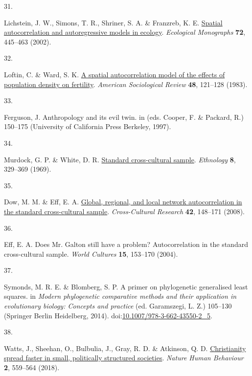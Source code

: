 \documentclass[
  man,floatsintext]{apa6}
\newlength{\cslhangindent}
\newlength{\csllabelwidth}
\newlength{\cslentryspacingunit} %
\newenvironment{CSLReferences}[2] %
 {%
  \setlength{\parindent}{0pt}
  \ifodd #1
  \let\oldpar\par
  \def\par{\hangindent=\cslhangindent\oldpar}
  \fi
  \setlength{\parskip}{#2\cslentryspacingunit}
 }%
 {}
\newcommand{\CSLLeftMargin}[1]{\parbox[t]{\csllabelwidth}{#1}}
\newcommand{\CSLRightInline}[1]{\parbox[t]{\linewidth - \csllabelwidth}{#1}\break}
\begin{document}
\begin{CSLReferences}{0}{0}
\leavevmode{}%
\CSLLeftMargin{31. }%
\CSLRightInline{Lichstein, J. W., Simons, T. R., Shriner, S. A. \& Franzreb, K. E. \href{https://doi.org/10.1890/0012-9615(2002)072\%5B0445:SAAAMI\%5D2.0.CO;2}{Spatial autocorrelation and autoregressive models in ecology}. \emph{Ecological Monographs} \textbf{72}, 445--463 (2002).}

\leavevmode{}%
\CSLLeftMargin{32. }%
\CSLRightInline{Loftin, C. \& Ward, S. K. \href{https://doi.org/10.2307/2095150}{A spatial autocorrelation model of the effects of population density on fertility}. \emph{American Sociological Review} \textbf{48}, 121--128 (1983).}

\leavevmode{}%
\CSLLeftMargin{33. }%
\CSLRightInline{Ferguson, J. Anthropology and its evil twin. in (eds. Cooper, F. \& Packard, R.) 150--175 (University of California Press Berkeley, 1997).}

\leavevmode{}%
\CSLLeftMargin{34. }%
\CSLRightInline{Murdock, G. P. \& White, D. R. \href{https://doi.org/10.2307/3772907}{Standard cross-cultural sample}. \emph{Ethnology} \textbf{8}, 329--369 (1969).}

\leavevmode{}%
\CSLLeftMargin{35. }%
\CSLRightInline{Dow, M. M. \& Eff, E. A. \href{https://doi.org/10.1177/1069397107311186}{Global, regional, and local network autocorrelation in the standard cross-cultural sample}. \emph{Cross-Cultural Research} \textbf{42}, 148--171 (2008).}

\leavevmode{}%
\CSLLeftMargin{36. }%
\CSLRightInline{Eff, E. A. Does {M}r. {G}alton still have a problem? Autocorrelation in the standard cross-cultural sample. \emph{World Cultures} \textbf{15}, 153--170 (2004).}

\leavevmode{}%
\CSLLeftMargin{37. }%
\CSLRightInline{Symonds, M. R. E. \& Blomberg, S. P. A primer on phylogenetic generalised least squares. in \emph{Modern phylogenetic comparative methods and their application in evolutionary biology: Concepts and practice} (ed. Garamszegi, L. Z.) 105--130 (Springer Berlin Heidelberg, 2014). doi:\href{https://doi.org/10.1007/978-3-662-43550-2_5}{10.1007/978-3-662-43550-2\_5}.}

\leavevmode{}%
\CSLLeftMargin{38. }%
\CSLRightInline{Watts, J., Sheehan, O., Bulbulia, J., Gray, R. D. \& Atkinson, Q. D. \href{https://doi.org/10.1038/s41562-018-0379-3}{Christianity spread faster in small, politically structured societies}. \emph{Nature Human Behaviour} \textbf{2}, 559--564 (2018).}


\end{CSLReferences}
\end{document}
